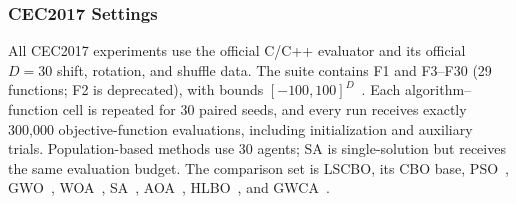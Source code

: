 \documentclass[pdflatex,onecolumn,sn-mathphys-num]{sn-jnl}
\begin{document}
\subsubsection{CEC2017 Settings}
All CEC2017 experiments use the official C/C++ evaluator and its official $D=30$ shift, rotation, and shuffle data. The suite contains F1 and F3--F30 (29 functions; F2 is deprecated), with bounds $[-100,100]^D$~\cite{CEC2017}. Each algorithm--function cell is repeated for 30 paired seeds, and every run receives exactly 300,000 objective-function evaluations, including initialization and auxiliary trials. Population-based methods use 30 agents; SA is single-solution but receives the same evaluation budget. The comparison set is LSCBO, its CBO base, PSO~\cite{Kennedy1995}, GWO~\cite{Mirjalili2014}, WOA~\cite{Mirjalili2016}, SA~\cite{Kirkpatrick1983}, AOA~\cite{Abualigah2021}, HLBO~\cite{Dehghani2022HLBO}, and GWCA~\cite{Guan2023GWCA}.
\end{document}
